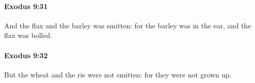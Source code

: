 		\paragraph{Exodus 9:31} %
			\label{EXODUS-9-31}

			And the flax and the barley was smitten: for the barley was in the ear, and the flax was bolled.


		\paragraph{Exodus 9:32} %
			\label{EXODUS-9-32}

			But the wheat and the rie were not smitten: for they were not grown up.


